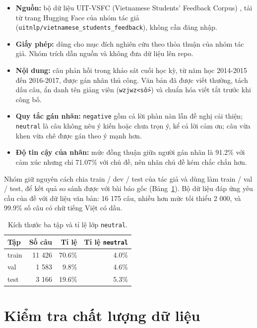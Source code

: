 \begin{itemize}
  \item \textbf{Nguồn:} bộ dữ liệu UIT-VSFC (Vietnamese Students' Feedback Corpus) \cite{text-vsfc}, tải từ trang Hugging Face
        của nhóm tác giả (\texttt{uitnlp/vietnamese\_students\_feedback}), không cần đăng nhập.
  \item \textbf{Giấy phép:} dùng cho mục đích nghiên cứu theo thỏa thuận của nhóm tác giả. Nhóm trích dẫn nguồn và không
        đưa dữ liệu lên repo.
  \item \textbf{Nội dung:} câu phản hồi trong khảo sát cuối học kỳ, từ năm học 2014-2015 đến 2016-2017, được gán nhãn thủ
        công. Văn bản đã được viết thường, tách dấu câu, ẩn danh tên giảng viên (\texttt{wzjwz<số>}) và chuẩn hóa viết tắt
        trước khi công bố.
  \item \textbf{Quy tắc gán nhãn:} \texttt{negative} gồm cả lời phàn nàn lẫn đề nghị cải thiện; \texttt{neutral} là câu
        không nêu ý kiến hoặc chưa trọn ý, kể cả lời cảm ơn; câu vừa khen vừa chê được gán theo ý mạnh hơn.
  \item \textbf{Độ tin cậy của nhãn:} mức đồng thuận giữa người gán nhãn là 91.2\% với cảm xúc nhưng chỉ 71.07\% với chủ
        đề, nên nhãn chủ đề kém chắc chắn hơn.
\end{itemize}

Nhóm giữ nguyên cách chia train / dev / test của tác giả và dùng làm train / val / test, để kết quả so sánh được
với bài báo gốc (Bảng~\ref{tab:text-split}). Bộ dữ liệu đáp ứng yêu cầu của đề với dữ liệu văn bản: 16 175 câu, nhiều
hơn mức tối thiểu 2 000, và 99.9\% số câu có chữ tiếng Việt có dấu.

\begin{table}[H]\centering
\caption{Kích thước ba tập và tỉ lệ lớp \texttt{neutral}.}\label{tab:text-split}
\begin{tabular}{lrrr}
\toprule
Tập & Số câu & Tỉ lệ & Tỉ lệ \texttt{neutral} \\
\midrule
train & 11 426 & 70.6\% & 4.0\% \\
val & 1 583 & 9.8\% & 4.6\% \\
test & 3 166 & 19.6\% & 5.3\% \\
\bottomrule
\end{tabular}
\end{table}

\section{Kiểm tra chất lượng dữ liệu}

